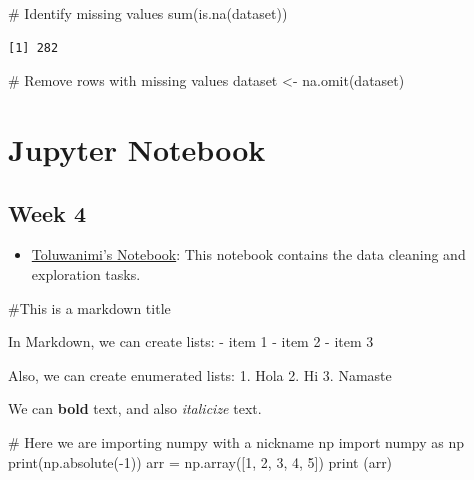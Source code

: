 \documentclass[
  letterpaper,
  DIV=11,
  numbers=noendperiod]{scrreprt}
\newenvironment{Shaded}{\begin{snugshade}}{\end{snugshade}}
\newcommand{\BuiltInTok}[1]{\textcolor[rgb]{0.00,0.23,0.31}{#1}}
\newcommand{\CommentTok}[1]{\textcolor[rgb]{0.37,0.37,0.37}{#1}}
\newcommand{\DecValTok}[1]{\textcolor[rgb]{0.68,0.00,0.00}{#1}}
\newcommand{\FunctionTok}[1]{\textcolor[rgb]{0.28,0.35,0.67}{#1}}
\newcommand{\ImportTok}[1]{\textcolor[rgb]{0.00,0.46,0.62}{#1}}
\newcommand{\NormalTok}[1]{\textcolor[rgb]{0.00,0.23,0.31}{#1}}
\newcommand{\OperatorTok}[1]{\textcolor[rgb]{0.37,0.37,0.37}{#1}}
\newcommand{\OtherTok}[1]{\textcolor[rgb]{0.00,0.23,0.31}{#1}}
\providecommand{\tightlist}{%
  \setlength{\itemsep}{0pt}\setlength{\parskip}{0pt}}\usepackage{longtable,booktabs,array}
\begin{document}
\begin{Shaded}
\begin{Highlighting}[]
\CommentTok{\# Identify missing values}
\FunctionTok{sum}\NormalTok{(}\FunctionTok{is.na}\NormalTok{(dataset))}
\end{Highlighting}
\end{Shaded}

\begin{verbatim}
[1] 282
\end{verbatim}

\begin{Shaded}
\begin{Highlighting}[]
\CommentTok{\# Remove rows with missing values}
\NormalTok{dataset }\OtherTok{\textless{}{-}} \FunctionTok{na.omit}\NormalTok{(dataset)}
\end{Highlighting}
\end{Shaded}

\section{Jupyter Notebook}\label{jupyter-notebook}

\subsection{Week 4}\label{week-4-3}

\begin{itemize}
\tightlist
\item
  \href{Tut2_Python_Olufawo_09_21_24.ipynb}{Toluwanimi's Notebook}: This
  notebook contains the data cleaning and exploration tasks.
\end{itemize}

\#This is a markdown title

In Markdown, we can create lists: - item 1 - item 2 - item 3

Also, we can create enumerated lists: 1. Hola 2. Hi 3. Namaste

We can \textbf{bold} text, and also \emph{italicize} text.

\begin{Shaded}
\begin{Highlighting}[]
\CommentTok{\# Here we are importing numpy with a nickname np}
\ImportTok{import}\NormalTok{ numpy }\ImportTok{as}\NormalTok{ np}
\BuiltInTok{print}\NormalTok{(np.absolute(}\OperatorTok{{-}}\DecValTok{1}\NormalTok{))}
\NormalTok{arr }\OperatorTok{=}\NormalTok{ np.array([}\DecValTok{1}\NormalTok{, }\DecValTok{2}\NormalTok{, }\DecValTok{3}\NormalTok{, }\DecValTok{4}\NormalTok{, }\DecValTok{5}\NormalTok{])}
\BuiltInTok{print}\NormalTok{ (arr)}
\end{Highlighting}
\end{Shaded}
\end{document}

